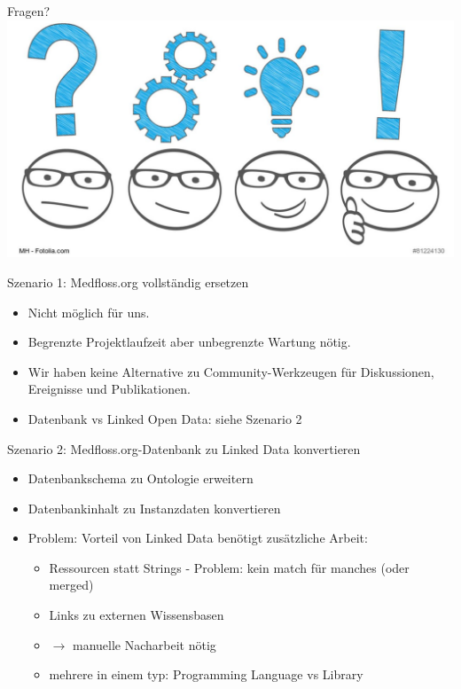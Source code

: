 \documentclass[aspectratio=1610,12pt]{beamer}
\begin{document}
\begin{frame}{Fragen?}
  \centering
  \vspace{-0.5cm}
  \includegraphics[width=\textwidth]{img/fragen.png}
\end{frame}

\begin{frame}{Szenario 1: Medfloss.org vollständig ersetzen}
\begin{itemize}
\item Nicht möglich für uns.
\item Begrenzte Projektlaufzeit aber unbegrenzte Wartung nötig.
\item Wir haben keine Alternative zu Community-Werkzeugen für Diskussionen, Ereignisse und Publikationen.
\item Datenbank vs Linked Open Data: siehe Szenario 2
\end{itemize}
\end{frame}

\begin{frame}{Szenario 2: Medfloss.org-Datenbank zu Linked Data konvertieren}
\begin{itemize}
\item Datenbankschema zu Ontologie erweitern
\item Datenbankinhalt zu Instanzdaten konvertieren
\item Problem: Vorteil von Linked Data benötigt zusätzliche Arbeit:
\begin{itemize}
\item Ressourcen statt Strings - Problem: kein match für manches (oder merged)
\item Links zu externen Wissensbasen
\item $\rightarrow$ manuelle Nacharbeit nötig
\item mehrere in einem typ: Programming Language vs Library
\end{itemize}
\end{itemize}
\end{frame}
\end{document}
